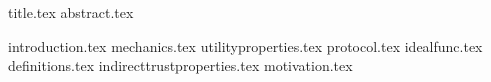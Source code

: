 \documentclass[11pt]{llncs}
\begin{document}
{title.tex}
\thispagestyle{plain}
{abstract.tex}

{introduction.tex}
{mechanics.tex}
{utilityproperties.tex}
{protocol.tex}
{idealfunc.tex}
{definitions.tex}
{indirecttrustproperties.tex}
{motivation.tex}

\end{document}
